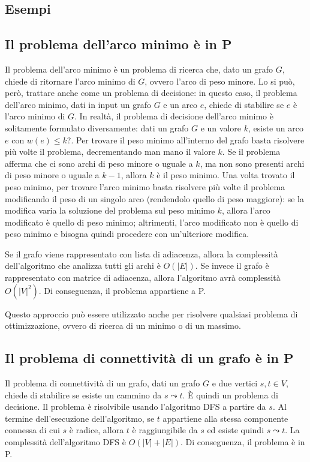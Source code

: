 \subsection{Esempi}
\subsection*{Il problema dell'arco minimo è in P}
Il problema dell'arco minimo è un problema di ricerca che, dato un grafo $G$, chiede di ritornare l'arco minimo di $G$, ovvero l'arco di peso minore.
Lo si può, però, trattare anche come un problema di decisione: in questo caso, il problema dell'arco minimo, dati in input un grafo $G$ e un arco $e$, chiede di stabilire se $e$ è l'arco minimo di $G$.
In realtà, il problema di decisione dell'arco minimo è solitamente formulato diversamente: dati un grafo $G$ e un valore $k$, esiste un arco $e$ con $w(e) \le k$?.
Per trovare il peso minimo all'interno del grafo basta risolvere più volte il problema, decrementando man mano il valore $k$. Se il problema afferma che ci sono archi di peso minore o uguale a $k$, ma non sono presenti archi di peso minore o uguale a $k-1$, allora $k$ è il peso minimo.
Una volta trovato il peso minimo, per trovare l'arco minimo basta risolvere più volte il problema modificando il peso di un singolo arco (rendendolo quello di peso maggiore): se la modifica varia la soluzione del problema sul peso minimo $k$, allora l'arco modificato è quello di peso minimo; altrimenti, l'arco modificato non è quello di peso minimo e bisogna quindi procedere con un'ulteriore modifica.

Se il grafo viene rappresentato con lista di adiacenza, allora la complessità dell'algoritmo che analizza tutti gli archi è $O(|E|)$. Se invece il grafo è rappresentato con matrice di adiacenza, allora l'algoritmo avrà complessità $O(|V|^2)$.
Di conseguenza, il problema appartiene a P.

Questo approccio può essere utilizzato anche per risolvere qualsiasi problema di ottimizzazione, ovvero di ricerca di un minimo o di un massimo.


\subsection*{Il problema di connettività di un grafo è in P}
Il problema di connettività di un grafo, dati un grafo $G$ e due vertici $s, t \in V$, chiede di stabilire se esiste un cammino da $s \leadsto t$.
È quindi un problema di decisione.
Il problema è risolvibile usando l'algoritmo DFS a partire da $s$.
Al termine dell'esecuzione dell'algoritmo, se $t$ appartiene alla stessa componente connessa di cui $s$ è radice, allora
$t$ è raggiungibile da $s$ ed esiste quindi $s \leadsto t$.
La complessità dell'algoritmo DFS è $O(|V| + |E|)$.
Di conseguenza, il problema è in P.

